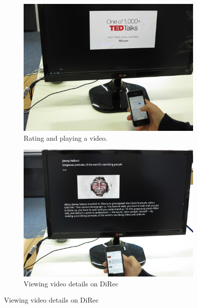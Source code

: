 \begin{figure}
    \centering
    \begin{subfigure}[b]{0.3\textwidth}
        \includegraphics[width=\textwidth]{figures/IMG_6807}
        \caption{Rating and playing a video.}
        \label{fig:figure52a}
    \end{subfigure}
   
    \begin{subfigure}[b]{0.3\textwidth}
        \includegraphics[width=\textwidth]{figures/IMG_6809}
        \caption{Viewing video details on DiRec}
        \label{fig:figure52b}
    \end{subfigure}
    

\end{figure}
